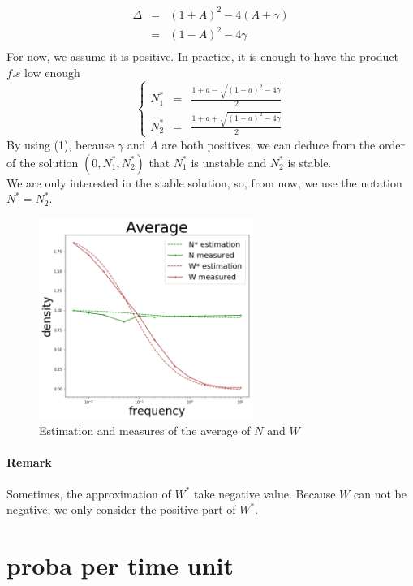 \documentclass{article}
\begin{document}
\[
\begin{array}{rcl}
\Delta & = & (1+A)^2 - 4(A+\gamma) \\
& = & (1-A)^2 - 4\gamma \\
\end{array}
\]
For now, we assume it is positive. %
In practice, it is enough to have the product $f.s$ low enough %
\[
\left\lbrace
\begin{array}{rcl}
N_1^* & = & \frac{1+a-\sqrt{(1-a)^2-4\gamma}}{2} \\
N_2^* & = & \frac{1+a+\sqrt{(1-a)^2-4\gamma}}{2}
\end{array}
\right.
\]
By using (1), because $\gamma$ and $A$ are both positives, we can deduce from the order of the solution $(0, N_1^*, N_2^*)$ that $N_1^*$ is unstable and $N_2^*$ is stable. 
\\
We are only interested in the stable solution, so, from now, we use the notation $N^* = N_2^*$.



\begin{figure}[h!]
\centering
\includegraphics[width=7cm]{average.png}
\caption{Estimation and measures of the average of $N$ and $W$}
\end{figure}

\paragraph{Remark}
Sometimes, the approximation of $W^*$ take negative value. Because $W$ can not be negative, we only consider the positive part of $W^*$.




\newpage
\section{proba per time unit}
\label{proba_per_time_unit}
\end{document}
